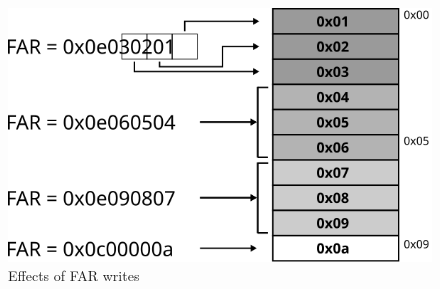 \documentclass[a4paper,11pt]{article}
\begin{document}
\begin{appendices}
\begin{figure}[h]
  \centerline{\includegraphics[scale=1]{fig/multiple-spi}}
  \caption{Effects of FAR writes}
  \label{fig:multiple-spi}
\end{figure}

\end{appendices}

\pagebreak


\end{document}
